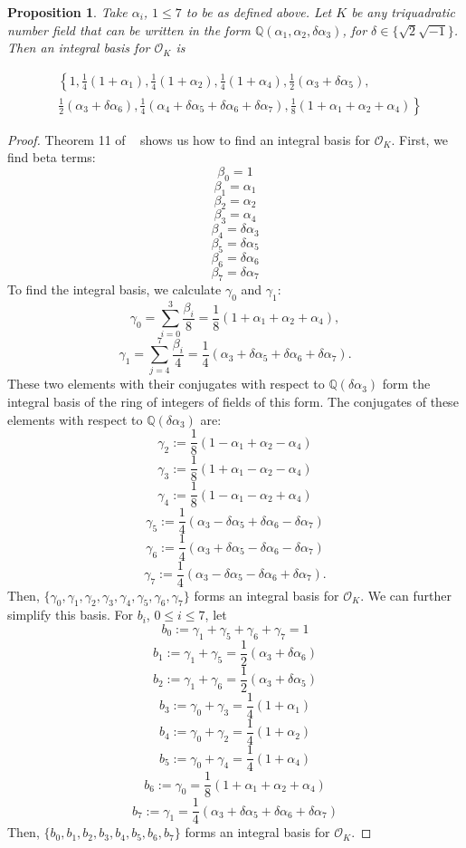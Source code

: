 \documentclass{amsart}
\newtheorem{Proposition}{Proposition}
\begin{document}
\begin{Proposition}
Take $\alpha_i$, $1\leq 7$ to be as defined above. Let $K$ be any triquadratic number field that can be written in the form $\mathbb{Q}\left(\alpha_1,\alpha_2,\delta\alpha_3\right)$, for $\delta \in \{\sqrt{2}\sqrt{-1}\}$. Then an integral basis for $\mathcal{O}_K$ is 


\begin{align*}
      & \left\{1,\frac{1}{4}(1+\alpha_1),\frac{1}{4}(1+\alpha_2),\frac{1}{4}(1+\alpha_4), \frac{1}{2}(\alpha_3 + \delta\alpha_5),  \right. \\
      &  \left. \frac{1}{2}(\alpha_3 + \delta\alpha_6),\frac{1}{4}(\alpha_4 + \delta\alpha_5 + \delta\alpha_6 + \delta\alpha_7), \frac{1}{8}(1+\alpha_1+\alpha_2+\alpha_4) \right\}
\end{align*}
\end{Proposition}
\begin{proof}Theorem 11  of ~\cite{Chat} shows us how to find an integral basis for $\mathcal{O}_K$. First, we find beta terms:
$$\beta_0 = 1$$
$$\beta_1 = \alpha_1$$
$$\beta_2 = \alpha_2$$
$$\beta_3 = \alpha_4$$
$$\beta_4 = \delta \alpha_3$$
$$\beta_5 = \delta\alpha_5$$
$$\beta_6 = \delta\alpha_6$$
$$\beta_7 = \delta\alpha_7$$
To find the integral basis, we calculate $\gamma_0$ and $\gamma_1$:
$$\gamma_0 = \sum_{i=0}^3 \frac{\beta_i}{8} = \frac{1}{8}\left(1+\alpha_1 + \alpha_2 + \alpha_4 \right),$$
$$\gamma_1 = \sum_{j=4}^7 \frac{\beta_i}{4} = \frac{1}{4}\left(\alpha_3 + \delta \alpha_5 + \delta\alpha_6 + \delta\alpha_7\right).$$
These two elements with their conjugates with respect to $\mathbb{Q}\left(\delta\alpha_3\right)$ form the integral basis of the ring of integers of fields of this form. The conjugates of these elements with respect to $\mathbb{Q}(\delta \alpha_3)$ are:
$$ \gamma_2 := \frac{1}{8} \left ( 1-\alpha_1 + \alpha_2 - \alpha_4\right)$$
$$ \gamma_3 := \frac{1}{8} \left (1 + \alpha_1 - \alpha_2 - \alpha_4\right)$$
$$ \gamma_4 := \frac{1}{8} \left (1 - \alpha_1 - \alpha_2 + \alpha_4\right)$$
$$ \gamma_5 := \frac{1}{4}\left(\alpha_3 - \delta\alpha_5 + \delta\alpha_6 - \delta\alpha_7\right)$$
$$ \gamma_6 := \frac{1}{4}\left(\alpha_3 + \delta\alpha_5 - \delta\alpha_6 - \delta\alpha_7\right)$$
$$ \gamma_7 := \frac{1}{4}\left(\alpha_3 - \delta\alpha_5 - \delta\alpha_6 + \delta\alpha_7\right).$$
Then, $\{\gamma_0, \gamma_1, \gamma_2, \gamma_3,\gamma_4, \gamma_5, \gamma_6, \gamma_7\}$ forms an integral basis for $\mathcal{O}_K$. We can further simplify this basis. For $b_i$, $0 \leq i \leq 7$, let
$$ b_0 := \gamma_1 + \gamma_5 + \gamma_6 + \gamma_7 = 1$$
$$b_1 := \gamma_1 + \gamma_5 = \frac{1}{2}\left(\alpha_3 + \delta\alpha_6\right)$$
$$b_2 := \gamma_1 + \gamma_6 = \frac{1}{2}\left(\alpha_3 + \delta \alpha_5\right)$$
$$b_3 := \gamma_0 + \gamma_3 = \frac{1}{4}\left(1 + \alpha_1\right)$$
$$b_4 := \gamma_0 + \gamma_2 = \frac{1}{4}\left(1 + \alpha_2\right)$$
$$b_5 := \gamma_0 + \gamma_4 = \frac{1}{4}\left(1 + \alpha_4\right)$$
$$b_6 := \gamma_0 = \frac{1}{8}\left(1 + \alpha_1 + \alpha_2 + \alpha_4\right)$$
$$b_7 := \gamma_1 = \frac{1}{4}\left(\alpha_3 + \delta\alpha_5 + \delta\alpha_6 + \delta \alpha_7\right)$$
Then, $\{b_0,b_1,b_2,b_3,b_4,b_5,b_6,b_7\}$ forms an integral basis for $\mathcal{O}_K$. \end{proof}
\end{document}
